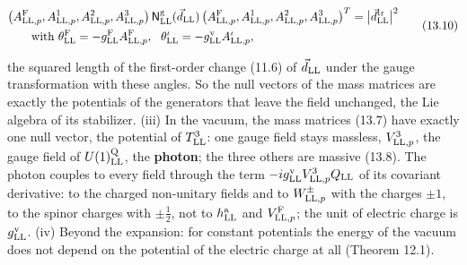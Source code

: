 \documentclass[
  10pt,
]{article}
\begin{document}
\[\begin{aligned}&\big(A^{\rm F}_{{\rm LL},p},A^1_{{\rm LL},p},A^2_{{\rm LL},p},A^3_{{\rm LL},p}\big)\,\mathsf N^{\rm g}_{\rm LL}(\vec d_{\rm LL})\,\big(A^{\rm F}_{{\rm LL},p},A^1_{{\rm LL},p},A^2_{{\rm LL},p},A^3_{{\rm LL},p}\big)^T=\big\lvert\vec d^{\rm tr}_{\rm LL}\big\rvert^2\\&\qquad\text{with }\theta^{\rm F}_{\rm LL}=-g^{\rm F}_{\rm LL}A^{\rm F}_{{\rm LL},p},\ \ \theta^\iota_{\rm LL}=-g^{\rm v}_{\rm LL}A^\iota_{{\rm LL},p},\end{aligned}\tag{13.10}\]

the squared length of the first-order change (11.6) of
\(\vec d_{\rm LL}\) under the gauge transformation with these angles. So
the null vectors of the mass matrices are exactly the potentials of the
generators that leave the field unchanged, the Lie algebra of its
stabilizer. (iii) In the vacuum, the mass matrices (13.7) have exactly
one null vector, the potential of \(T^3_{\rm LL}\): one gauge field
stays massless, \(V^3_{{\rm LL},p}\), the gauge field of
\(U(1)^{\rm Q}_{\rm LL}\), the \textbf{photon}; the three others are
massive (13.8). The photon couples to every field through the term
\(-ig^{\rm v}_{\rm LL}V^3_{{\rm LL},p}Q_{\rm LL}\) of its covariant
derivative: to the charged non-unitary fields and to
\(W^\pm_{{\rm LL},p}\) with the charges \(\pm1\), to the spinor charges
with \(\pm\tfrac12\), not to \(h^{\rm a}_{\rm LL}\) and
\(V^{\rm F}_{{\rm LL},p}\); the unit of electric charge is
\(g^{\rm v}_{\rm LL}\). (iv) Beyond the expansion: for constant
potentials the energy of the vacuum does not depend on the potential of
the electric charge at all (Theorem 12.1).
\end{document}
